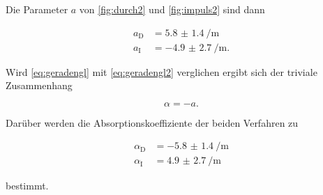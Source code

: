 Die Parameter $a$ von \autoref{fig:durch2} und \autoref{fig:impuls2} sind dann

\begin{align}
    a_\text{D} &= \SI{5.8(14)}{\per\meter}\\
    a_\text{I} &= \SI{-4.9(27)}{\per\meter}.
\end{align}

Wird \eqref{eq:geradengl} mit \eqref{eq:geradengl2} verglichen ergibt sich der triviale Zusammenhang 

\begin{equation}
    \alpha = - a.
\end{equation}

Darüber werden die Absorptionskoeffiziente der beiden Verfahren zu 

\begin{align}
    \alpha _\text{D} &= \SI{-5.8(14)}{\per\meter}\\
    \alpha _\text{I} &= \SI{4.9(27)}{\per\meter}
\end{align}

bestimmt.